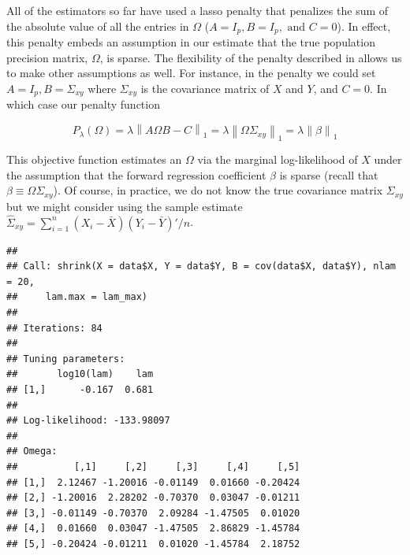 \documentclass[11pt,]{report}
\newenvironment{Shaded}{\begin{snugshade}}{\end{snugshade}}
\newcommand{\CommentTok}[1]{\textcolor[rgb]{0.56,0.35,0.01}{\textit{#1}}}
\newcommand{\DataTypeTok}[1]{\textcolor[rgb]{0.13,0.29,0.53}{#1}}
\newcommand{\DecValTok}[1]{\textcolor[rgb]{0.00,0.00,0.81}{#1}}
\newcommand{\KeywordTok}[1]{\textcolor[rgb]{0.13,0.29,0.53}{\textbf{#1}}}
\newcommand{\NormalTok}[1]{#1}
\newcommand{\OperatorTok}[1]{\textcolor[rgb]{0.81,0.36,0.00}{\textbf{#1}}}
\newcommand{\StringTok}[1]{\textcolor[rgb]{0.31,0.60,0.02}{#1}}
\theoremstyle{definition}
\theoremstyle{definition}
\theoremstyle{definition}
\theoremstyle{remark}
\begin{document}
\vspace{0.5cm}

All of the estimators so far have used a lasso penalty that penalizes the sum of the absolute value of all the entries in \(\Omega\) (\(A = I_{p}, B = I_{p}, \mbox{ and } C = 0\)). In effect, this penalty embeds an assumption in our estimate that the true population precision matrix, \(\Omega\), is sparse. The flexibility of the penalty described in \citet{molstad2017shrinking} allows us to make other assumptions as well. For instance, in the penalty we could set \(A = I_{p}, B = \Sigma_{xy}\) where \(\Sigma_{xy}\) is the covariance matrix of \(X\) and \(Y\), and \(C = 0\). In which case our penalty function

\[P_{\lambda}\left(\Omega \right) = \lambda\left\| A\Omega B - C \right\|_{1} = \lambda\left\| \Omega\Sigma_{xy} \right\|_{1} = \lambda\left\| \beta \right\|_{1} \]

This objective function estimates an \(\Omega\) via the marginal log-likelihood of \(X\) under the assumption that the forward regression coefficient \(\beta\) is sparse (recall that \(\beta \equiv \Omega\Sigma_{xy}\)). Of course, in practice, we do not know the true covariance matrix \(\Sigma_{xy}\) but we might consider using the sample estimate \(\hat{\Sigma}_{xy} = \sum_{i = 1}^{n}\left(X_{i} - \bar{X}\right)\left(Y_{i} - \bar{Y}\right)'/n\).

\vspace{0.5cm}

\begin{Shaded}
\end{Shaded}

\begin{verbatim}
## 
## Call: shrink(X = data$X, Y = data$Y, B = cov(data$X, data$Y), nlam = 20, 
##     lam.max = lam_max)
## 
## Iterations: 84
## 
## Tuning parameters:
##       log10(lam)    lam
## [1,]      -0.167  0.681
## 
## Log-likelihood: -133.98097
## 
## Omega:
##          [,1]     [,2]     [,3]     [,4]     [,5]
## [1,]  2.12467 -1.20016 -0.01149  0.01660 -0.20424
## [2,] -1.20016  2.28202 -0.70370  0.03047 -0.01211
## [3,] -0.01149 -0.70370  2.09284 -1.47505  0.01020
## [4,]  0.01660  0.03047 -1.47505  2.86829 -1.45784
## [5,] -0.20424 -0.01211  0.01020 -1.45784  2.18752
\end{verbatim}
\end{document}
